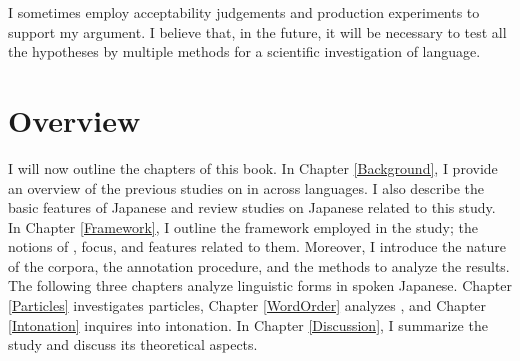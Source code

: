I sometimes employ acceptability judgements and production experiments
to support my argument.
I believe that, in the future,
it will be necessary to test all the hypotheses by multiple methods
for a scientific investigation of language.


\section{Overview}\label{IntroOverview}

I will now outline the chapters of this book.
In Chapter \ref{Background},
I provide an overview of the previous studies on  in across languages.
I also describe the basic features of Japanese and review studies on Japanese related to this study.
In Chapter \ref{Framework},
I outline the framework employed in the study;
the notions of , focus, and features related to them.
Moreover, I introduce the nature of the corpora,
the annotation procedure, and the methods to analyze the results.
The following three chapters analyze linguistic forms in spoken Japanese.
Chapter \ref{Particles} investigates particles,
Chapter \ref{WordOrder} analyzes , and
Chapter \ref{Intonation} inquires into intonation.
In Chapter \ref{Discussion},
I summarize the study and discuss its theoretical aspects.


















